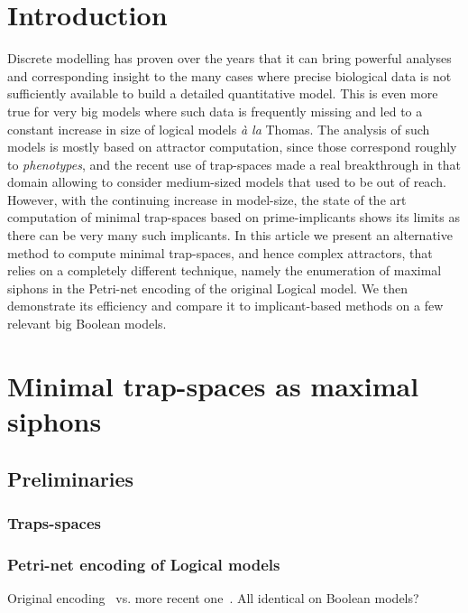 \documentclass[runningheads]{llncs}
\begin{document}
\section{Introduction}

Discrete modelling has proven over the years that it can bring powerful analyses and corresponding insight to the many cases where precise biological data is not sufficiently available to build a detailed quantitative model.
This is even more true for very big models where such data is frequently missing and led to a constant increase in size of logical models \emph{à la} Thomas.
The analysis of such models is mostly based on attractor computation, since those correspond roughly to \emph{phenotypes}, and the recent use of trap-spaces made a real breakthrough in that domain allowing to consider medium-sized models that used to be out of reach.
However, with the continuing increase in model-size, the state of the art computation of minimal trap-spaces based on prime-implicants shows its limits as there can be very many such implicants.
In this article we present an alternative method to compute minimal trap-spaces, and hence complex attractors, that relies on a completely different technique, namely the enumeration of maximal siphons in the Petri-net encoding of the original Logical model.
We then demonstrate its efficiency and compare it to implicant-based methods on a few relevant big Boolean models.

\section{Minimal trap-spaces as maximal siphons}
\subsection{Preliminaries}
\subsubsection{Traps-spaces}

\cite{klarner2015computing,klarner2017pyboolnet,cifuentes2020control}

\subsubsection{Petri-net encoding of Logical models}

Original encoding~\cite{chaouiya2004qualitative,chaouiya2011petri} vs. more recent one~\cite{chatain2014characterization}.
All identical on Boolean models?
\end{document}
